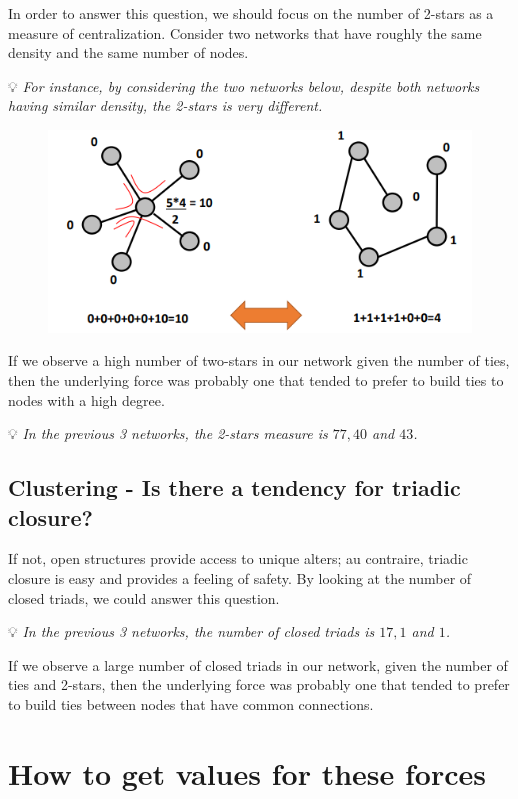 \documentclass[
  notitlepage,
  onecolumn,
  openany]{book}
\begin{document}
In order to answer this question, we should focus on the number of 2-stars as a measure of centralization. Consider two networks that have roughly the same density and the same number of nodes.

💡 \emph{For instance, by considering the two networks below, despite both networks having similar density, the 2-stars is very different.}

\begin{figure}[h!]

{\centering \includegraphics[width=0.5\linewidth]{images/13-ERGMs/Untitled 1} 

}

\end{figure}

If we observe a high number of two-stars in our network given the number of ties, then the underlying force was probably one that tended to prefer to build ties to nodes with a high degree.

💡 \emph{In the previous 3 networks, the 2-stars measure is \(77, 40\) and \(43\).}

\hypertarget{clustering---is-there-a-tendency-for-triadic-closure}{%
\subsection{Clustering - Is there a tendency for triadic closure?}\label{clustering---is-there-a-tendency-for-triadic-closure}}

If not, open structures provide access to unique alters; au contraire, triadic closure is easy and provides a feeling of safety. By looking at the number of closed triads, we could answer this question.

💡 \emph{In the previous 3 networks, the number of closed triads is \(17, 1\) and \(1\).}

If we observe a large number of closed triads in our network, given the number of ties and 2-stars, then the underlying force was probably one that tended to prefer to build ties between nodes that have common connections.

\hypertarget{how-to-get-values-for-these-forces}{%
\section{How to get values for these forces}\label{how-to-get-values-for-these-forces}}
\end{document}
